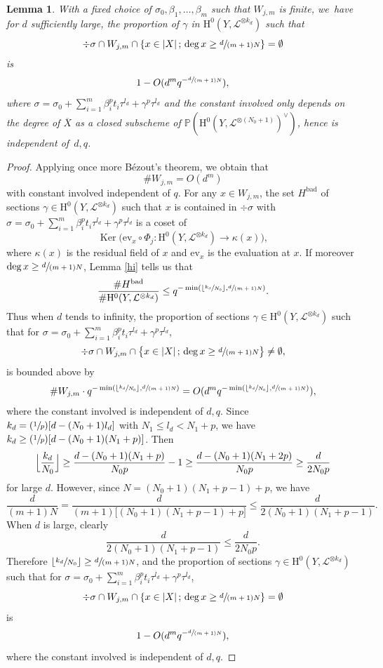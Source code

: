 \documentclass[JEP,XML,SOM,Unicode,published]{cedram}
\newcommand{\Psfrac}[2]{(\sfrac{#1}{#2})}
\newcommand{\sep}{\,;\,}
\theoremstyle{plain}
\newtheorem{lem}[thm]{Lemma}
\theoremstyle{definition}
\newcommand{\ho}{\mathrm{H}}
\newcommand{\li}{\mathcal{L}}
\newcommand{\pr}{\mathbb{P}}
\DeclareMathOperator{\Ker}{Ker}
\begin{document}
\begin{lem}\label{finiteset}
With a fixed choice of $\sigma_0, \beta_1,\dots, \beta_m$ such that $W_{j,m}$ is finite, we~have for $d$ sufficiently large, the proportion of $\gamma $ in $\ho^0(Y,\mathcal{L}^{\otimes k_d})$ such that
\[
\div \sigma\cap W_{j,m}\cap \left\{ x\in |X|\sep \deg x\geq\sfrac{d}{(m+1)N} \right\}=\emptyset
\]
is
\[
1-O(d^m q^{-\sfrac{d}{(m+1)N}}),
\]
where $\sigma=\sigma_0+\sum_{i=1}^{m} \beta_i^pt_i\tau^{l_d}+\gamma^p\tau^{l_d}$ and the constant involved only depends on the degree of $\overline{X}$ as a closed subscheme of $\pr(\ho^0(Y, \li^{\otimes (N_0+1)})^{\vee})$, hence is independent of~$d,q$.
\end{lem}
\begin{proof}[Proof]
Applying once more Bézout's theorem, we obtain that
\[
\#W_{j,m}=O(d^m)
\]
with constant involved independent of $q$. For any $x\in W_{j,m}$, the set $H^{\mathrm{bad}}$ of sections $\gamma\in \ho^0(Y, \li^{\otimes k_d})$ such that $x$ is contained in $\div \sigma$ with $\sigma=\sigma_0+\sum_{i=1}^{m} \beta_i^pt_i\tau^{l_d}+\gamma^p\tau^{l_d}$ is a coset of
\[
\Ker \bigl(\mathrm{ev}_x\circ \Phi_j: \ho^0(Y, \mathcal{L}^{\otimes k_d})\to \kappa(x) \bigr),
\]
where $\kappa(x)$ is the residual field of $x$ and $\mathrm{ev}_x$ is the evaluation at $x$. If moreover $\deg x\geq\sfrac{d}{(m+1)N}$, Lemma \ref{hi} tells us that
\[
\frac{\#H^{\mathrm{bad}}}{\#\ho^0(Y, \li^{\otimes k_d})} \leq q^{-\min(\lfloor\sfrac{k_d}{N_0}\rfloor, \sfrac{d}{(m+1)N})}.
\]
Thus when $d$ tends to infinity, the proportion of sections $\gamma \in \ho^0(Y, \li^{\otimes k_d})$ such that for $\sigma=\sigma_0+\sum_{i=1}^{m} \beta_i^pt_i\tau^{l_d}+\gamma^p\tau^{l_d}$,
\[
\div \sigma\cap W_{j,m}\cap \bigl\{ x\in |X|\sep \deg x\geq\sfrac{d}{(m+1)N} \bigr\}\not=\emptyset,
\]
is bounded above by
\[
\#W_{j,m}\cdot q^{-\min(\lfloor\sfrac{k_d}{N_0}\rfloor, \sfrac{d}{(m+1)N})}= O(d^m q^{-\min(\lfloor\sfrac{k_d}{N_0}\rfloor, \sfrac{d}{(m+1)N})}),
\]
where the constant involved is independent of $d,q$. Since $k_d=\Psfrac{1}{p}[d-(N_0+1)l_d]$ with $N_1\leq l_d< N_1+p$, we have $k_d\geq \Psfrac{1}{p}[d-(N_0+1)(N_1+p)]$. Then
\[
\Bigl\lfloor\frac{k_d}{N_0}\Bigr\rfloor\geq \frac{d-(N_0+1)(N_1+p)}{N_0 p}-1\geq \frac{d-(N_0+1)(N_1+2p)}{N_0 p}\geq \frac{d}{2N_0p}
\]
for large $d$. However, since $N= (N_0+1)(N_1+p-1)+p$, we have
\[
\frac{d}{(m+1)N}= \frac{d}{(m+1)\big[(N_0+1)(N_1+p-1)+p\big]}\leq \frac{d}{2(N_0+1)(N_1+p-1)}.
\]
When $d$ is large, clearly
\[
\frac{d}{2(N_0+1)(N_1+p-1)}\leq \frac{d}{2N_0p}.
\]
Therefore $\lfloor\sfrac{k_d}{N_0}\rfloor\geq \sfrac{d}{(m+1)N}$, and the proportion of sections $\gamma \in \ho^0(Y, \li^{\otimes k_d})$ such that for $\sigma=\sigma_0+\sum_{i=1}^{m} \beta_i^pt_i\tau^{l_d}+\gamma^p\tau^{l_d}$,
\[
\div \sigma\cap W_{j,m}\cap \{ x\in |X|\sep \deg x\geq\sfrac{d}{(m+1)N} \}=\emptyset
\]
is
\[
1-O(d^m q^{-\sfrac{d}{(m+1)N}}),
\]
where the constant involved is independent of $d,q$.
\end{proof}
\end{document}
